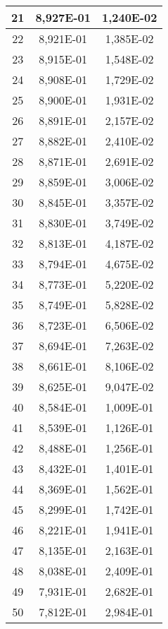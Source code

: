 \documentclass[12pt]{article}
\begin{document}
\begin{center}
\begin{longtable}{|c|c|c|}
    21	&     8,927E-01	&   1,240E-02 \\ \hline
    22	&     8,921E-01	&   1,385E-02 \\ \hline
    23	&     8,915E-01	&   1,548E-02 \\ \hline
    24	&     8,908E-01	&   1,729E-02 \\ \hline
    25	&     8,900E-01	&   1,931E-02 \\ \hline
    26	&     8,891E-01	&   2,157E-02 \\ \hline
    27	&     8,882E-01	&   2,410E-02 \\ \hline
    28	&     8,871E-01	&   2,691E-02 \\ \hline
    29	&     8,859E-01	&   3,006E-02 \\ \hline
    30	&     8,845E-01	&   3,357E-02 \\ \hline
    31	&     8,830E-01	&   3,749E-02 \\ \hline
    32	&     8,813E-01	&   4,187E-02 \\ \hline
    33	&     8,794E-01	&   4,675E-02 \\ \hline
    34	&     8,773E-01	&   5,220E-02 \\ \hline
    35	&     8,749E-01	&   5,828E-02 \\ \hline
    36	&     8,723E-01	&   6,506E-02 \\ \hline
    37	&     8,694E-01	&   7,263E-02 \\ \hline
    38	&     8,661E-01	&   8,106E-02 \\ \hline
    39	&     8,625E-01	&   9,047E-02 \\ \hline
    40	&     8,584E-01	&   1,009E-01 \\ \hline
    41	&     8,539E-01	&   1,126E-01 \\ \hline
    42	&     8,488E-01	&   1,256E-01 \\ \hline
    43	&     8,432E-01	&   1,401E-01 \\ \hline
    44	&     8,369E-01	&   1,562E-01 \\ \hline
    45	&     8,299E-01	&   1,742E-01 \\ \hline
    46	&     8,221E-01	&   1,941E-01 \\ \hline
    47	&     8,135E-01	&   2,163E-01 \\ \hline
    48	&     8,038E-01	&   2,409E-01 \\ \hline
    49	&     7,931E-01	&   2,682E-01 \\ \hline
    50	&     7,812E-01	&   2,984E-01 \\ \hline

\end{longtable}
\end{center}
\end{document}
